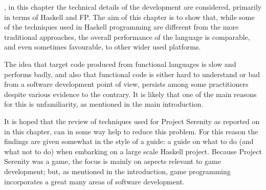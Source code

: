 
, in this chapter the technical details of the development are considered, primarily in terms of Haskell and FP. The aim of this chapter is to show that, while some of the techniques used in Haskell programming are different from the more traditional approaches, the overall performance of the language is comparable, and even sometimes favourable, to other wider used platforms.

The idea that target code produced from functional languages is slow and performs badly, and also that functional code is either hard to understand or bad from a software development point of view, persists among some practitioners despite various evidence to the contrary.\cite{roundy2005darcs} It is likely that one of the main reasons for this is unfamiliarity, as mentioned in the main introduction.

It is hoped that the review of techniques used for Project Serenity as reported on in this chapter, can in some way help to reduce this problem. For this reason the findings are given somewhat in the style of a guide: a guide on what to do (and what not to do) when embarking on a large scale Haskell project. Because Project Serenity was a game, the focus is mainly on aspects relevant to game development; but, as mentioned in the introduction, game programming incorporates a great many areas of software development.
